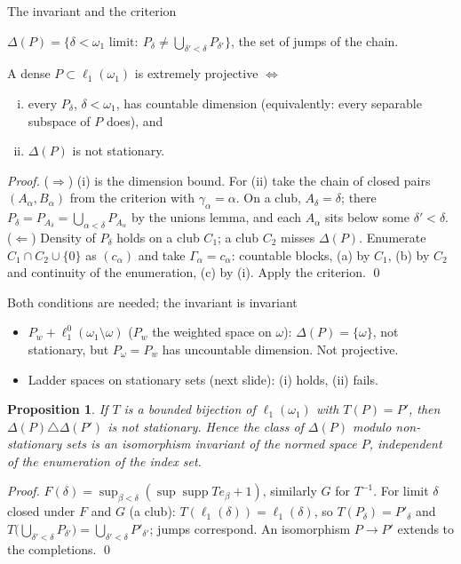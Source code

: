 \documentclass[10pt,aspectratio=169]{beamer}
\newtheorem{proposition}[theorem]{Proposition}
\newcommand{\lo}[1]{\ell_1^0(#1)}
\newcommand{\ellone}[1]{\ell_1(#1)}
\newcommand{\supp}{\operatorname{supp}}
\begin{document}
\begin{frame}{The invariant and the criterion}
  \begin{definition}
    $\Delta(P)=\{\delta<\omega_1\text{ limit}:\ P_\delta\neq\bigcup_{\delta'<\delta}P_{\delta'}\}$,
    the set of \alert{jumps} of the chain.
  \end{definition}
  \begin{theorem}
    A dense $P\subset\ellone{\omega_1}$ is extremely projective $\iff$
    \begin{enumerate}[(i)]
      \item every $P_\delta$, $\delta<\omega_1$, has countable dimension
        (equivalently: every separable subspace of $P$ does), and
      \item $\Delta(P)$ is not stationary.
    \end{enumerate}
  \end{theorem}
  \textit{Proof.} ($\Rightarrow$) (i) is the dimension bound. For (ii) take the
  chain of closed pairs $(A_\alpha,B_\alpha)$ from the criterion with
  $\gamma_\alpha=\alpha$. On a club, $A_\delta=\delta$; there $P_\delta=P_{A_\delta}=\bigcup_{\alpha<\delta}P_{A_\alpha}$
  by the unions lemma, and each $A_\alpha$ sits below some $\delta'<\delta$. \\
  ($\Leftarrow$) Density of $P_\delta$ holds on a club $C_1$; a club $C_2$ misses
  $\Delta(P)$. Enumerate $C_1\cap C_2\cup\{0\}$ as ${(c_\alpha)}$ and take
  $\Gamma_\alpha=c_\alpha$: countable blocks, (a) by $C_1$, (b) by $C_2$ and
  continuity of the enumeration, (c) by (i). Apply the criterion. \qed
\end{frame}

\begin{frame}{Both conditions are needed; the invariant is invariant}
  \begin{itemize}
    \item $P_w+\lo{\omega_1\setminus\omega}$ ($P_w$ the weighted space on $\omega$):
      $\Delta(P)=\{\omega\}$, not stationary, but $P_\omega=P_w$ has uncountable
      dimension. Not projective.
    \item Ladder spaces on stationary sets (next slide): (i) holds, (ii) fails.
  \end{itemize}
  \begin{proposition}
    If $T$ is a bounded bijection of $\ellone{\omega_1}$ with $T(P)=P'$, then
    $\Delta(P)\triangle\Delta(P')$ is not stationary. Hence the class of
    $\Delta(P)$ modulo non-stationary sets is an isomorphism invariant of the
    normed space $P$, independent of the enumeration of the index set.
  \end{proposition}
  \textit{Proof.} $F(\delta)=\sup_{\beta<\delta}(\sup\supp T e_\beta+1)$, similarly
  $G$ for $T^{-1}$. For limit $\delta$ closed under $F$ and $G$ (a club):
  $T(\ellone\delta)=\ellone\delta$, so $T(P_\delta)=P'_\delta$ and
  $T\bigl(\bigcup_{\delta'<\delta}P_{\delta'}\bigr)=\bigcup_{\delta'<\delta}P'_{\delta'}$;
  jumps correspond. An isomorphism $P\to P'$ extends to the completions. \qed
\end{frame}
\end{document}
